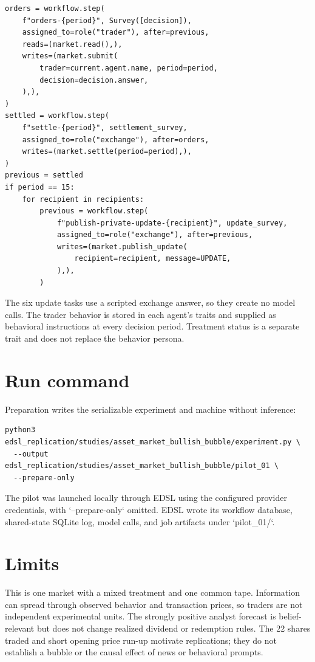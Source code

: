 \documentclass[11pt]{article}
\begin{document}
\begin{lstlisting}
orders = workflow.step(
    f"orders-{period}", Survey([decision]),
    assigned_to=role("trader"), after=previous,
    reads=(market.read(),),
    writes=(market.submit(
        trader=current.agent.name, period=period,
        decision=decision.answer,
    ),),
)
settled = workflow.step(
    f"settle-{period}", settlement_survey,
    assigned_to=role("exchange"), after=orders,
    writes=(market.settle(period=period),),
)
previous = settled
if period == 15:
    for recipient in recipients:
        previous = workflow.step(
            f"publish-private-update-{recipient}", update_survey,
            assigned_to=role("exchange"), after=previous,
            writes=(market.publish_update(
                recipient=recipient, message=UPDATE,
            ),),
        )
\end{lstlisting}

The six update tasks use a scripted exchange answer, so they create no model
calls. The trader behavior is stored in each agent's traits and supplied as
behavioral instructions at every decision period. Treatment status is a
separate trait and does not replace the behavior persona.

\section{Run command}
Preparation writes the serializable experiment and machine without inference:

\begin{lstlisting}
python3 edsl_replication/studies/asset_market_bullish_bubble/experiment.py \
  --output edsl_replication/studies/asset_market_bullish_bubble/pilot_01 \
  --prepare-only
\end{lstlisting}

The pilot was launched locally through EDSL using the configured provider
credentials, with `--prepare-only` omitted. EDSL wrote its workflow database,
shared-state SQLite log, model calls, and job artifacts under `pilot\_01/`.

\section{Limits}
This is one market with a mixed treatment and one common tape. Information can
spread through observed behavior and transaction prices, so traders are not
independent experimental units. The strongly positive analyst forecast is
belief-relevant but does not change realized dividend or redemption rules. The
22 shares traded and short opening price run-up motivate replications; they do
not establish a bubble or the causal effect of news or behavioral prompts.
\end{document}
